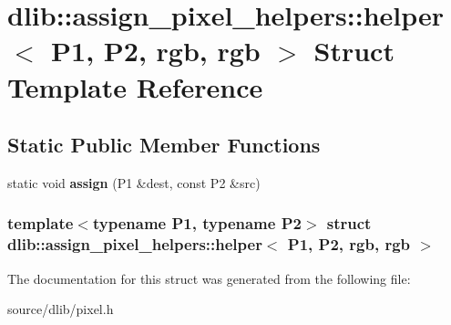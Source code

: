 \hypertarget{structdlib_1_1assign__pixel__helpers_1_1helper_3_01P1_00_01P2_00_01rgb_00_01rgb_01_4}{
\section{dlib::assign\_\-pixel\_\-helpers::helper$<$ P1, P2, rgb, rgb $>$ Struct Template Reference}
\label{structdlib_1_1assign__pixel__helpers_1_1helper_3_01P1_00_01P2_00_01rgb_00_01rgb_01_4}
}
\subsection*{Static Public Member Functions}
\begin{DoxyCompactItemize}
\item 
\hypertarget{structdlib_1_1assign__pixel__helpers_1_1helper_3_01P1_00_01P2_00_01rgb_00_01rgb_01_4_a832b9ff21b629a9bffd3774d5332c3aa}{
static void {\bfseries assign} (P1 \&dest, const P2 \&src)}
\label{structdlib_1_1assign__pixel__helpers_1_1helper_3_01P1_00_01P2_00_01rgb_00_01rgb_01_4_a832b9ff21b629a9bffd3774d5332c3aa}

\end{DoxyCompactItemize}
\subsubsection*{template$<$typename P1, typename P2$>$ struct dlib::assign\_\-pixel\_\-helpers::helper$<$ P1, P2, rgb, rgb $>$}



The documentation for this struct was generated from the following file:\begin{DoxyCompactItemize}
\item 
source/dlib/pixel.h\end{DoxyCompactItemize}
